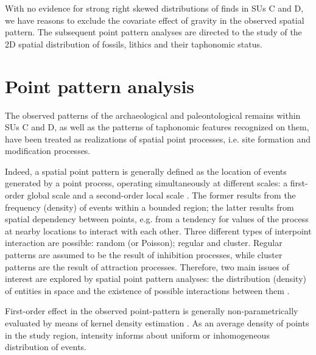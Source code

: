 \documentclass[5p,authoryear]{elsarticle} %
\begin{document}
With no evidence for strong right skewed distributions of finds in SUs C and D, we have reasons to exclude the covariate effect of gravity in the observed spatial pattern. The subsequent point pattern analyses are directed to the study of the 2D spatial distribution of fossils, lithics and their taphonomic status.

\section{Point pattern analysis}

The observed patterns of the archaeological and paleontological remains within SUs C and D, as well as the patterns of taphonomic features recognized on them, have been treated as realizations of spatial point processes, i.e. site formation and modification processes.

Indeed, a spatial point pattern is generally defined as the location of events generated by a point process, operating simultaneously at different scales: a first-order global scale and a second-order local scale \citep{Bailey1995}. The former results from the frequency (density) of events within a bounded region; the latter results from spatial dependency between points, e.g. from a tendency for values of the process at nearby locations to interact with each other. Three different types of interpoint interaction are possible: random (or Poisson); regular and cluster. Regular patterns are assumed to be the result of inhibition processes, while cluster patterns are the result of attraction processes. Therefore, two main issues of interest are explored by spatial point pattern analyses: the distribution (density) of entities in space and the existence of possible interactions between them \citep{Ord1972}.

First-order effect in the observed point-pattern is generally non-parametrically evaluated by means of kernel density estimation \citep{Diggle1985}. As an average density of points in the study region, intensity informs about uniform or inhomogeneous distribution of events.
\end{document}
